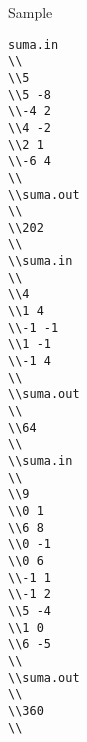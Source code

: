 Sample
\begin{verbatim}
suma.in 
\\
\\5 
\\5 -8 
\\-4 2 
\\4 -2 
\\2 1 
\\-6 4 
\\
\\suma.out 
\\
\\202 
\\
\\suma.in 
\\
\\4 
\\1 4 
\\-1 -1 
\\1 -1 
\\-1 4 
\\
\\suma.out 
\\
\\64
\\
\\suma.in 
\\
\\9 
\\0 1 
\\6 8 
\\0 -1 
\\0 6 
\\-1 1 
\\-1 2 
\\5 -4 
\\1 0 
\\6 -5 
\\
\\suma.out 
\\
\\360 
\\\end{verbatim}
